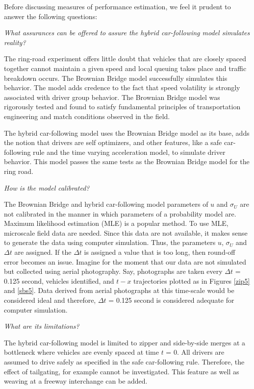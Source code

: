 \documentclass[Proceedings]{ascelike}
\begin{document}
Before discussing  measures of performance estimation, we feel it prudent to answer the following questions: 

\noindent \emph{What assurances can be offered to assure the hybrid car-following model simulates reality? }

 The ring-road experiment offers little doubt that vehicles that are closely spaced together cannot maintain a given speed and local queuing takes place and traffic breakdown occurs. The Brownian Bridge model successfully simulates this behavior. The model adds credence to the fact that speed volatility is strongly associated with driver group behavior. The Brownian Bridge model was  rigorously tested and found to satisfy fundamental principles of transportation engineering and match conditions observed in the field. 
 
 The hybrid car-following model uses the Brownian Bridge model as its base, adds the notion that drivers are self optimizers, and other features, like a safe car-following rule and the time varying acceleration model, to simulate driver behavior. This model  passes the same tests as the Brownian Bridge model for the ring road.

\noindent \emph{How is the model calibrated? } 

The Brownian Bridge and hybrid car-following model parameters of $u$ and $\sigma_U$ are not calibrated in the manner in which parameters of a probability model are. Maximum likelihood estimation (MLE) is a popular method. To use MLE, microscale field data are needed. Since this data are not available, it makes sense to generate the data using computer simulation. Thus, the parameters $u$, $\sigma_U$ and $\Delta t$ are assigned.  If the $\Delta t$ is assigned a value that is too long, then round-off error becomes an issue. Imagine for the moment that our data are not simulated but collected using aerial photography. Say, photographs are taken every  $\Delta t$ = 0.125 second,  vehicles identified, and $t-x$ trajectories plotted as in Figures \ref{zip5} and \ref{sbs5}. Data derived from aerial photographs at this time-scale would be considered ideal and therefore, $\Delta t$ = 0.125 second is considered adequate for computer simulation.

\noindent \emph{What are its limitations?} 

The hybrid car-following model is limited to zipper and side-by-side merges at a bottleneck where vehicles are  evenly spaced at time $t$ = 0. All drivers are assumed to drive safely as specified in the safe car-following rule. Therefore, the effect of tailgating, for example cannot be investigated. This feature as well as  weaving at a freeway interchange can be added. 
\end{document}
